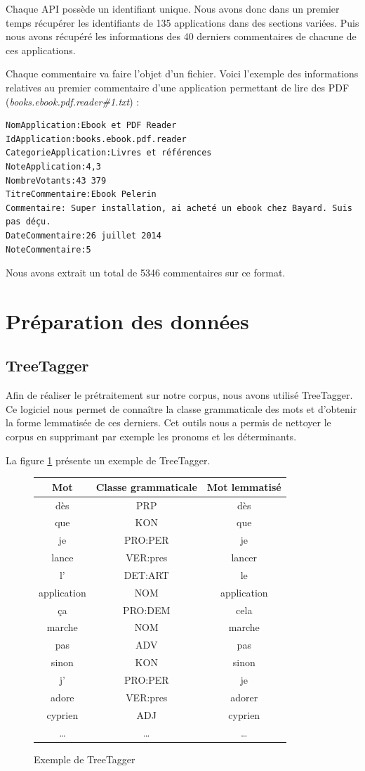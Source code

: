 \documentclass[a4paper, 11pt]{article}
\begin{document}
Chaque API possède un identifiant unique. Nous avons donc dans un premier temps récupérer les identifiants de 135 applications dans des sections variées. Puis nous avons récupéré les informations des 40 derniers commentaires de chacune de ces applications.

Chaque commentaire va faire l'objet d'un fichier. Voici l'exemple des informations relatives au premier commentaire d'une application permettant de lire des PDF (\textit{books.ebook.pdf.reader\#1.txt}) :

\begin{verbatim}
NomApplication:Ebook et PDF Reader
IdApplication:books.ebook.pdf.reader
CategorieApplication:Livres et références
NoteApplication:4,3
NombreVotants:43 379
TitreCommentaire:Ebook Pelerin
Commentaire: Super installation, ai acheté un ebook chez Bayard. Suis pas déçu.
DateCommentaire:26 juillet 2014
NoteCommentaire:5
\end{verbatim}


Nous avons extrait un total de 5346 commentaires sur ce format.

\section{Préparation des données}

\subsection{TreeTagger}
Afin de réaliser le prétraitement sur notre corpus, nous avons utilisé TreeTagger. Ce logiciel nous permet de connaître la classe grammaticale des mots et d’obtenir la forme lemmatisée de ces derniers. Cet outils nous a permis de nettoyer le corpus en supprimant par exemple les pronoms et les déterminants.

La figure \ref{treetagger} présente un exemple de TreeTagger.
\begin{figure}[!h]
\centering
 \begin{tabular}{|c|c|c|}
 \hline
	Mot&Classe grammaticale&Mot lemmatisé\\
 \hline
    dès&PRP&dès\\
    que&KON&que\\
    je&PRO:PER&je\\
    lance&VER:pres&lancer\\
    l'&DET:ART&le\\
    application&NOM&application\\
    ça&PRO:DEM&cela\\
    marche&NOM&marche\\
    pas&ADV&pas\\
    sinon&KON&sinon\\
    j'&PRO:PER&je\\
    adore&VER:pres&adorer\\
    cyprien&ADJ&cyprien\\
    \dots&\dots&\dots\\
 \hline
 \end{tabular}
 \caption{Exemple de TreeTagger}
\label{treetagger}
\end{figure}
\end{document}
